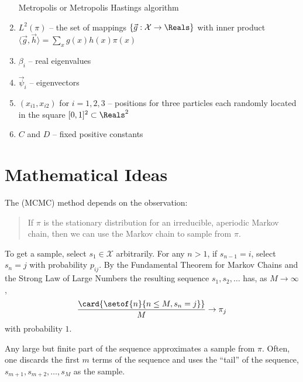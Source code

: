 \documentclass[12pt]{article}
\begin{document}
\begin{enumerate}
        Metropolis or Metropolis Hastings algorithm
    \item
        \( L^2(\pi) \) -- the set of mappings \( \{\vec{g} :  \mathcal{X}
        \to \Reals \} \) with inner product \( \langle \vec{g},\vec{h}
        \rangle = \sum_{x}g(x) h(x) \pi(x) \)
    \item
        \( \beta_i \) -- real eigenvalues
    \item
        \( \vec{\psi}_i \) -- eigenvectors
    \item
        \( (x_{i1}, x_{i2}) \) for \( i = 1,2,3 \) -- positions for
        three particles each randomly located in the square \( [0,1]^2
        \subset \Reals^2 \)
    \item
        \( C \) and \( D \) -- fixed positive constants

\end{enumerate}

\section*{Mathematical Ideas}


The  (MCMC)%
method depends on the observation:
\begin{quotation}
    If \( \pi \) is the stationary distribution for an irreducible,
    aperiodic Markov chain, then we can use the Markov chain to sample
    from \( \pi \).
\end{quotation}
To get a sample, select \( s_1 \in \mathcal{X} \) arbitrarily.  For any \(
n > 1 \), if \( s_{n-1} = i \), select \( s_n = j \) with probability \(
p_{ij} \).  By the Fundamental Theorem for Markov Chains and the Strong
Law of Large Numbers the resulting sequence \( s_1, s_2, \dots \) has,
as \( M \to \infty \),
\[
    \frac{\card{\setof{n}{n \le M, s_n = j}}}{M} \to \pi_j
\] with probability \( 1 \).

Any large but finite part of the sequence approximates a sample from \(
\pi \).  Often, one discards the first \( m \) terms of the sequence and
uses the ``tail'' of the sequence, \( s_{m+1}, s_{m+2}, \dots, s_M \) as
the sample.
\end{document}
